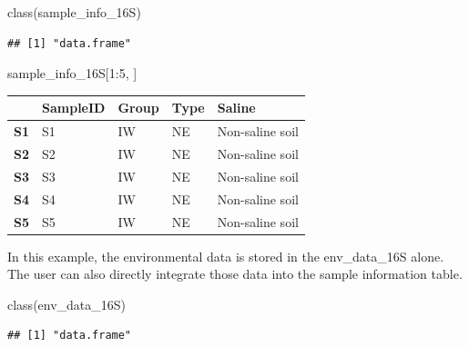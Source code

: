 \documentclass[
]{book}
\newenvironment{Shaded}{\begin{snugshade}}{\end{snugshade}}
\newcommand{\DecValTok}[1]{\textcolor[rgb]{0.00,0.00,0.81}{#1}}
\newcommand{\FunctionTok}[1]{\textcolor[rgb]{0.00,0.00,0.00}{#1}}
\newcommand{\NormalTok}[1]{#1}
\newcommand{\SpecialCharTok}[1]{\textcolor[rgb]{0.00,0.00,0.00}{#1}}
\begin{document}
\begin{Shaded}
\begin{Highlighting}[]
\FunctionTok{class}\NormalTok{(sample\_info\_16S)}
\end{Highlighting}
\end{Shaded}

\begin{verbatim}
## [1] "data.frame"
\end{verbatim}

\begin{Shaded}
\begin{Highlighting}[]
\NormalTok{sample\_info\_16S[}\DecValTok{1}\SpecialCharTok{:}\DecValTok{5}\NormalTok{, ]}
\end{Highlighting}
\end{Shaded}

\begin{longtable}[]{@{}
  >{\centering\arraybackslash}p{}
  >{\centering\arraybackslash}p{}
  >{\centering\arraybackslash}p{}
  >{\centering\arraybackslash}p{}
  >{\centering\arraybackslash}p{}@{}}
\toprule
~ & SampleID & Group & Type & Saline \\
\midrule
\endhead
\textbf{S1} & S1 & IW & NE & Non-saline soil \\
\textbf{S2} & S2 & IW & NE & Non-saline soil \\
\textbf{S3} & S3 & IW & NE & Non-saline soil \\
\textbf{S4} & S4 & IW & NE & Non-saline soil \\
\textbf{S5} & S5 & IW & NE & Non-saline soil \\
\bottomrule
\end{longtable}

In this example, the environmental data is stored in the env\_data\_16S alone.
The user can also directly integrate those data into the sample information table.

\begin{Shaded}
\begin{Highlighting}[]
\FunctionTok{class}\NormalTok{(env\_data\_16S)}
\end{Highlighting}
\end{Shaded}

\begin{verbatim}
## [1] "data.frame"
\end{verbatim}
\end{document}
